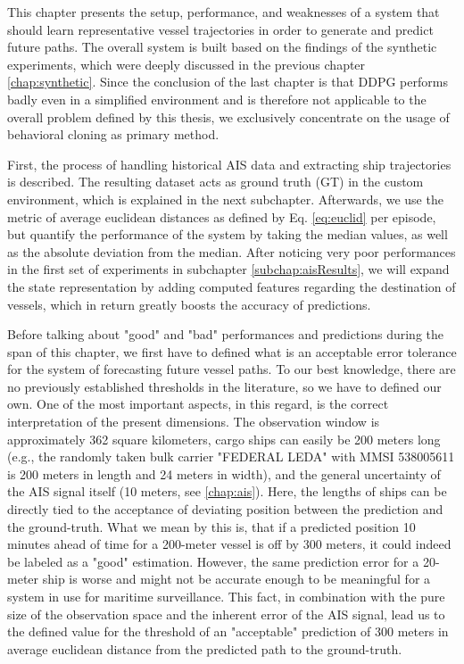 This chapter presents the setup, performance, and weaknesses of a system that should learn representative vessel trajectories in order to generate and predict future paths. The overall system is built based on the findings of the synthetic experiments, which were deeply discussed in the previous chapter \ref{chap:synthetic}. Since the conclusion of the last chapter is that DDPG performs badly even in a simplified environment and is therefore not applicable to the overall problem defined by this thesis, we exclusively concentrate on the usage of behavioral cloning as primary method. 
\par
First, the process of handling historical AIS data and extracting ship trajectories is described. The resulting dataset acts as ground truth (GT) in the custom environment, which is explained in the next subchapter. Afterwards, we use the metric of average euclidean distances as defined by Eq. \ref{eq:euclid} per episode, but quantify the performance of the system by taking the median values, as well as the absolute deviation from the median. After noticing very poor performances in the first set of experiments in subchapter \ref{subchap:aisResults}, we will expand the state representation by adding computed features regarding the destination of vessels, which in return greatly boosts the accuracy of predictions.
\par
Before talking about "good" and "bad" performances and predictions during the span of this chapter, we first have to defined what is an acceptable error tolerance for the system of forecasting future vessel paths. To our best knowledge, there are no previously established thresholds in the literature, so we have to defined our own. One of the most important aspects, in this regard, is the correct interpretation of the present dimensions. The observation window is approximately 362 square kilometers, cargo ships can easily be 200 meters long (e.g., the randomly taken bulk carrier "FEDERAL LEDA" with MMSI 538005611 is 200 meters in length and 24 meters in width), and the general uncertainty of the AIS signal itself (10 meters, see \ref{chap:ais}). Here, the lengths of ships can be directly tied to the acceptance of deviating position between the prediction and the ground-truth. What we mean by this is, that if a predicted position 10 minutes ahead of time for a 200-meter vessel is off by 300 meters, it could indeed be labeled as a "good" estimation. However, the same prediction error for a 20-meter ship is worse and might not be accurate enough to be meaningful for a system in use for maritime surveillance. This fact, in combination with the pure size of the observation space and the inherent error of the AIS signal, lead us to the defined value for the threshold of an "acceptable" prediction of 300 meters in average euclidean distance from the predicted path to the ground-truth.